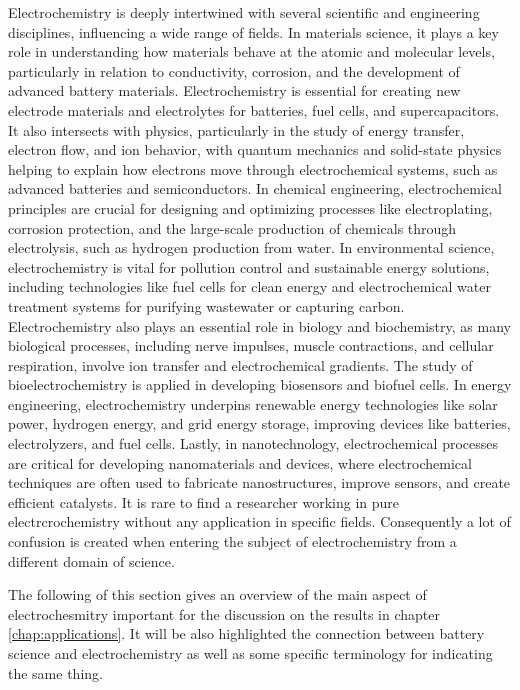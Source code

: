 Electrochemistry is deeply intertwined with several scientific and engineering disciplines, influencing a wide range of fields. In materials science, it plays a key role in understanding how materials behave at the atomic and molecular levels, particularly in relation to conductivity, corrosion, and the development of advanced battery materials. Electrochemistry is essential for creating new electrode materials and electrolytes for batteries, fuel cells, and supercapacitors. It also intersects with physics, particularly in the study of energy transfer, electron flow, and ion behavior, with quantum mechanics and solid-state physics helping to explain how electrons move through electrochemical systems, such as advanced batteries and semiconductors. In chemical engineering, electrochemical principles are crucial for designing and optimizing processes like electroplating, corrosion protection, and the large-scale production of chemicals through electrolysis, such as hydrogen production from water. In environmental science, electrochemistry is vital for pollution control and sustainable energy solutions, including technologies like fuel cells for clean energy and electrochemical water treatment systems for purifying wastewater or capturing carbon. Electrochemistry also plays an essential role in biology and biochemistry, as many biological processes, including nerve impulses, muscle contractions, and cellular respiration, involve ion transfer and electrochemical gradients. The study of bioelectrochemistry is applied in developing biosensors and biofuel cells. In energy engineering, electrochemistry underpins renewable energy technologies like solar power, hydrogen energy, and grid energy storage, improving devices like batteries, electrolyzers, and fuel cells. Lastly, in nanotechnology, electrochemical processes are critical for developing nanomaterials and devices, where electrochemical techniques are often used to fabricate nanostructures, improve sensors, and create efficient catalysts. It is rare to find a researcher working in pure electrcrochemistry without any application in specific fields. Consequently a lot of confusion is created when entering the subject of electrochemistry from a different domain of science. 

The following of this section gives an overview of the main aspect of electrochesmitry important for the discussion on the results in chapter \ref{chap:applications}. It will be also highlighted the connection between battery science and electrochemistry as well as some specific terminology for indicating the same thing.


